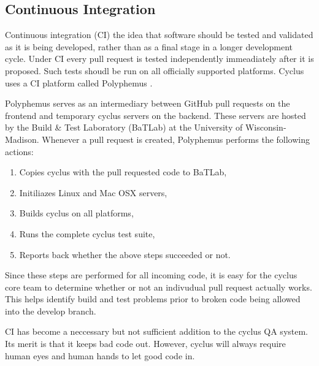 \subsection{Continuous Integration}
\label{sec:qa-ci}

Continuous integration (CI) the idea that software should be tested and validated 
as it is being developed, rather than as a final stage in a longer development 
cycle.  Under CI every pull request is tested independently immeadiately after 
it is proposed. Such tests shoudl be run on all officially supported platforms. 
Cyclus uses a CI platform called Polyphemus \cite{polyphemus_2014}. 

Polyphemus serves as an intermediary between GitHub pull requests on the frontend 
and temporary cyclus servers on the backend. These servers are hosted by 
the Build \& Test Laboratory (BaTLab) \cite{batlab_2014} at the University of 
Wisconsin-Madison. Whenever a pull request is created, Polyphemus performs 
the following actions:

\begin{enumerate}
    \item Copies cyclus with the pull requested code to BaTLab,
    \item Initiliazes Linux and Mac OSX servers,
    \item Builds cyclus on all platforms,
    \item Runs the complete cyclus test suite, 
    \item Reports back whether the above steps succeeded or not.
\end{enumerate}

Since these steps are performed for all incoming code, it is easy for the 
cyclus core team to determine whether or not an indivudual pull request 
actually works. This helps identify build and test problems prior to 
broken code being allowed into the develop branch.

CI has become a neccessary but not sufficient addition to the cyclus QA
system. Its merit is that it keeps bad code out. However, cyclus will always
require human eyes and human hands to let good code in.


